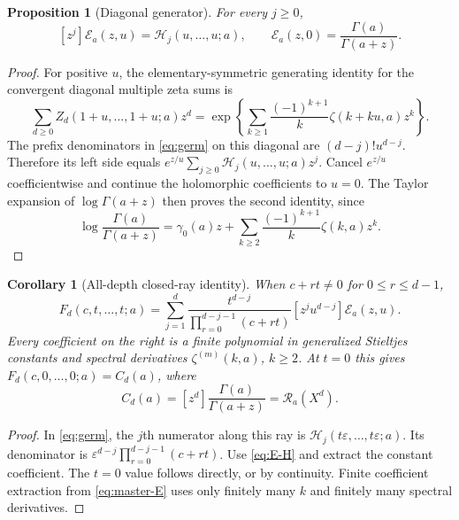 \documentclass[11pt]{article}
\numberwithin{equation}{section}
\newtheorem{proposition}[theorem]{Proposition}
\newtheorem{corollary}[theorem]{Corollary}
\theoremstyle{definition}
\newcommand{\R}{\mathcal R}
\newcommand{\HH}{\mathcal H}
\begin{document}
\begin{proposition}[Diagonal generator]\label{prop:diagonal-generator}
For every $j\ge0$,
\begin{equation}\label{eq:E-H}
 [z^j]\mathcal E_a(z,u)=\HH_j(u,\ldots,u;a),\qquad
 \mathcal E_a(z,0)=\frac{\Gamma(a)}{\Gamma(a+z)}.
\end{equation}
\end{proposition}
\begin{proof}
For positive $u$, the elementary-symmetric generating identity for the
convergent diagonal multiple zeta sums is
\[
 \sum_{d\ge0}Z_d(1+u,\ldots,1+u;a)z^d
 =\exp\left\{\sum_{k\ge1}\frac{(-1)^{k+1}}k\zeta(k+ku,a)z^k\right\}.
\]
The prefix denominators in \eqref{eq:germ} on this diagonal are
$(d-j)!u^{d-j}$. Therefore its left side equals
$e^{z/u}\sum_{j\ge0}\HH_j(u,\ldots,u;a)z^j$. Cancel $e^{z/u}$
coefficientwise and continue the holomorphic coefficients to $u=0$.
The Taylor expansion of $\log\Gamma(a+z)$ then proves the second
identity, since
\[
 \log\frac{\Gamma(a)}{\Gamma(a+z)}
 =\gamma_0(a)z+\sum_{k\ge2}\frac{(-1)^{k+1}}k\zeta(k,a)z^k.
\]
\end{proof}

\begin{corollary}[All-depth closed-ray identity]\label{cor:closed-ray}
When $c+rt\ne0$ for $0\le r\le d-1$,
\begin{equation}\label{eq:closed-ray}
 \boxed{\displaystyle
 F_d(c,t,\ldots,t;a)=\sum_{j=1}^d
 \frac{t^{d-j}}{\prod_{r=0}^{d-j-1}(c+rt)}
                    [z^ju^{d-j}]\mathcal E_a(z,u).}
\end{equation}
Every coefficient on the right is a finite polynomial in generalized
Stieltjes constants and spectral derivatives $\zeta^{(m)}(k,a)$,
$k\ge2$. At $t=0$ this gives $F_d(c,0,\ldots,0;a)=C_d(a)$, where
\begin{equation}\label{eq:C-gen}
 C_d(a)=[z^d]\frac{\Gamma(a)}{\Gamma(a+z)}=\R_a(X^d).
\end{equation}
\end{corollary}
\begin{proof}
In \eqref{eq:germ}, the $j$th numerator along this ray is
$\HH_j(t\varepsilon,\ldots,t\varepsilon;a)$. Its denominator is
$\varepsilon^{d-j}\prod_{r=0}^{d-j-1}(c+rt)$. Use
\eqref{eq:E-H} and extract the constant coefficient. The $t=0$ value
follows directly, or by continuity. Finite coefficient extraction from
\eqref{eq:master-E} uses only finitely many $k$ and finitely many spectral
derivatives.
\end{proof}
\end{document}

